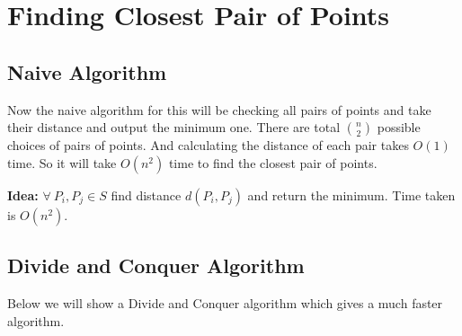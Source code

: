 \chapter{Finding Closest Pair of Points}
\begin{algoprob}
\end{algoprob}

\section{Naive Algorithm}

Now the naive algorithm for this will be checking all pairs of points and take their distance and output the minimum one. There are total $\binom{n }{2}$ possible choices of pairs of points. And calculating the distance of each pair takes $O(1)$ time. So it will take $O(n^2)$ time to find the closest pair of points. \parinf

\textbf{Idea:} $\forall\ P_i,P_j\in S$ find distance $d(P_i,P_j)$ and return the minimum. Time taken is $O(n^2)$.

\section{Divide and Conquer Algorithm}
Below we will show a Divide and Conquer algorithm which gives a much faster algorithm.

